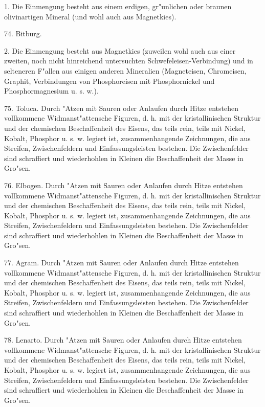 \documentclass[a4paper, 11pt, oneside, polutonikogreek, german]{article}
\begin{document}
\vspace{2ex}

1. Die Einmengung besteht aus einem erdigen, gr"unlichen oder braunen olivinartigen Mineral (und wohl auch aus Magnetkies).

\vspace{2ex}

74. Bitburg.

\vspace{2ex}

2. Die Einmengung besteht aus Magnetkies (zuweilen wohl auch aus einer zweiten, noch nicht hinreichend untersuchten Schwefeleisen-Verbindung) und in selteneren F"allen aus einigen anderen Mineralien (Magneteisen, Chromeisen, Graphit, Verbindungen von Phosphoreisen mit Phosphornickel und Phosphormagnesium u. s. w.).

\vspace{2ex}

75. Toluca. Durch "Atzen mit Sauren oder Anlaufen durch Hitze entstehen vollkommene Widmanst"attensche Figuren, d. h. mit der kristallinischen Struktur und der chemischen Beschaffenheit des Eisens, das teils rein, teils mit Nickel, Kobalt, Phosphor u. s. w. legiert ist, zusammenhangende Zeichnungen, die aus Streifen, Zwischenfeldern und Einfassungsleisten bestehen. Die Zwischenfelder sind schraffiert und wiederhohlen in Kleinen die Beschaffenheit der Masse in Gro"sen.

76. Elbogen. Durch "Atzen mit Sauren oder Anlaufen durch Hitze entstehen vollkommene Widmanst"attensche Figuren, d. h. mit der kristallinischen Struktur und der chemischen Beschaffenheit des Eisens, das teils rein, teils mit Nickel, Kobalt, Phosphor u. s. w. legiert ist, zusammenhangende Zeichnungen, die aus Streifen, Zwischenfeldern und Einfassungsleisten bestehen. Die Zwischenfelder sind schraffiert und wiederhohlen in Kleinen die Beschaffenheit der Masse in Gro"sen.

77. Agram. Durch "Atzen mit Sauren oder Anlaufen durch Hitze entstehen vollkommene Widmanst"attensche Figuren, d. h. mit der kristallinischen Struktur und der chemischen Beschaffenheit des Eisens, das teils rein, teils mit Nickel, Kobalt, Phosphor u. s. w. legiert ist, zusammenhangende Zeichnungen, die aus Streifen, Zwischenfeldern und Einfassungsleisten bestehen. Die Zwischenfelder sind schraffiert und wiederhohlen in Kleinen die Beschaffenheit der Masse in Gro"sen.

78. Lenarto. Durch "Atzen mit Sauren oder Anlaufen durch Hitze entstehen vollkommene Widmanst"attensche Figuren, d. h. mit der kristallinischen Struktur und der chemischen Beschaffenheit des Eisens, das teils rein, teils mit Nickel, Kobalt, Phosphor u. s. w. legiert ist, zusammenhangende Zeichnungen, die aus Streifen, Zwischenfeldern und Einfassungsleisten bestehen. Die Zwischenfelder sind schraffiert und wiederhohlen in Kleinen die Beschaffenheit der Masse in Gro"sen.
\end{document}
